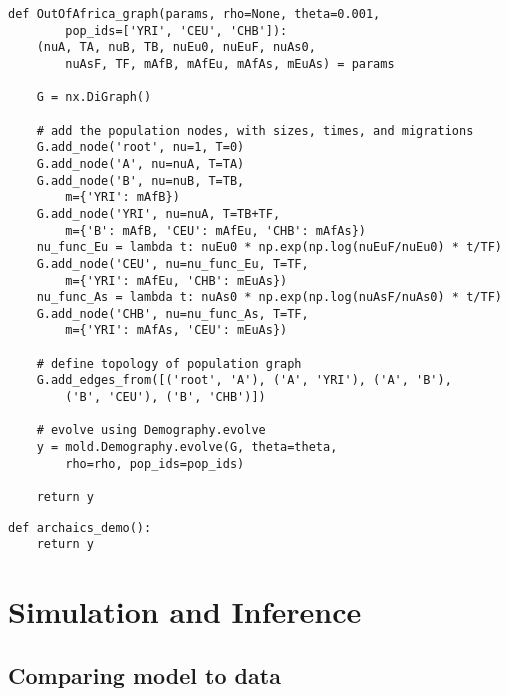 \documentclass[10pt]{article}
\makeatletter
\newcommand{\py}[1]{\lstinline[breaklines=true,language=Python, showstringspaces=False]@#1@}
\renewcommand{\lstlistingname}{Example Code}
\makeatother
\begin{document}
\begin{lstlisting}[caption={\textbf{Out of Africa Demography graph:} The same model as \lstlistingname~\ref{lst:ooa}, but defined using the Demography module. The Demography method takes advantage of the package \py{networkx}, which we \py{import networkx as nx}. Here, we define populations (nodes) with attributes (such as migration rates and sizes), and then define edges to relate populations.}, float, label={lst:ooa_demo}]
def OutOfAfrica_graph(params, rho=None, theta=0.001, 
        pop_ids=['YRI', 'CEU', 'CHB']):
    (nuA, TA, nuB, TB, nuEu0, nuEuF, nuAs0, 
        nuAsF, TF, mAfB, mAfEu, mAfAs, mEuAs) = params
    
    G = nx.DiGraph()
    
    # add the population nodes, with sizes, times, and migrations
    G.add_node('root', nu=1, T=0)
    G.add_node('A', nu=nuA, T=TA)
    G.add_node('B', nu=nuB, T=TB, 
        m={'YRI': mAfB})
    G.add_node('YRI', nu=nuA, T=TB+TF, 
        m={'B': mAfB, 'CEU': mAfEu, 'CHB': mAfAs})
    nu_func_Eu = lambda t: nuEu0 * np.exp(np.log(nuEuF/nuEu0) * t/TF)
    G.add_node('CEU', nu=nu_func_Eu, T=TF, 
        m={'YRI': mAfEu, 'CHB': mEuAs})
    nu_func_As = lambda t: nuAs0 * np.exp(np.log(nuAsF/nuAs0) * t/TF)
    G.add_node('CHB', nu=nu_func_As, T=TF, 
        m={'YRI': mAfAs, 'CEU': mEuAs})
        
    # define topology of population graph
    G.add_edges_from([('root', 'A'), ('A', 'YRI'), ('A', 'B'),
        ('B', 'CEU'), ('B', 'CHB')])
        
    # evolve using Demography.evolve
    y = mold.Demography.evolve(G, theta=theta, 
        rho=rho, pop_ids=pop_ids)
        
    return y
\end{lstlisting}

\begin{lstlisting}[caption={\textbf{Archaic Hominin Demography:}}, float, label={lst:archaic_demo}]
def archaics_demo():
    return y
\end{lstlisting}


\clearpage

\section{Simulation and Inference}


\subsection{Comparing model to data}
\end{document}
